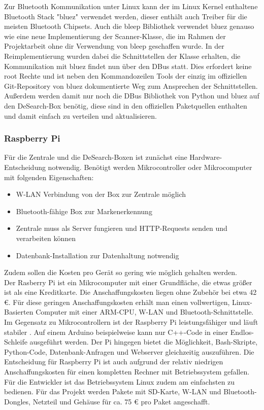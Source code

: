 Zur Bluetooth Kommunikation unter Linux kann der im Linux Kernel enthaltene Bluetooth Stack "bluez" verwendet werden, dieser enthält auch Treiber für die meisten Bluetooth Chipsets.
Auch die bleep Bibliothek verwendet bluez genauso wie eine neue Implementierung der Scanner-Klasse, die im Rahmen der Projektarbeit ohne dir Verwendung von bleep geschaffen wurde.
In der Reimplementierung wurden dabei die Schnittstellen der Klasse erhalten, die Kommunikation mit bluez findet nun über den DBus statt. Dies erfordert keine root Rechte und ist neben den Kommandozeilen Tools der einzig im offiziellen Git-Repository von bluez dokumentierte Weg zum Ansprechen der Schnittstellen. \cite{bluez-git} Außerdem werden damit nur noch die DBus Bibliothek von Python und bluez auf den DeSearch-Box benötig, diese sind in den offiziellen Paketquellen enthalten und damit einfach zu verteilen und aktualisieren.


\subsubsection{Raspberry Pi}
Für die Zentrale und die DeSearch-Boxen ist zunächst eine Hardware-Entscheidung notwendig. Benötigt werden Mikrocontroller oder Mikrocomputer mit folgenden Eigenschaften:
\begin{itemize}
	\item W-LAN Verbindung von der Box zur Zentrale möglich
	\item Bluetooth-fähige Box zur Markenerkennung
	\item Zentrale muss als Server fungieren und HTTP-Requests senden und verarbeiten können
	\item Datenbank-Installation zur Datenhaltung notwendig
\end{itemize}
Zudem sollen die Kosten pro Gerät so gering wie möglich gehalten werden. \\
Der Rasberry Pi ist ein Mikrocomputer mit einer Grundfläche, die etwas größer ist als eine Kreditkarte. Die Anschaffungskosten liegen ohne Zubehör bei etwa 42 €. Für diese geringen Anschaffungskosten erhält man einen vollwertigen, Linux-Basierten Computer mit einer ARM-CPU, W-LAN und Bluetooth-Schnittstelle. Im Gegensatz zu Mikrocontrollern ist der Raspberry Pi leistungsfähiger und läuft stabiler \citep[Vgl.][S.35ff.]{raspi}. Auf einem Arduino beispielweise kann nur C++-Code in einer Endlos-Schleife ausgeführt werden. Der Pi hingegen bietet die Möglichkeit, Bash-Skripte, Python-Code, Datenbank-Anfragen und Webserver gleichzeitig auszuführen. Die Entscheidung für Raspberry Pi ist auch aufgrund der relativ niedrigen Anschaffungskosten für einen kompletten Rechner mit Betriebssystem gefallen. Für die Entwickler ist das Betriebssystem Linux zudem am einfachsten zu bedienen. Für das Projekt werden Pakete mit SD-Karte, W-LAN und Bluetooth-Dongles, Netzteil und Gehäuse für ca. 75 € pro Paket angeschafft.
